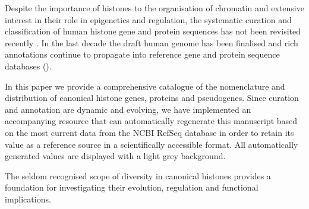   Despite the importance of histones to the organisation of chromatin and extensive interest
  in their role in epigenetics and regulation, the systematic curation and classification of human histone
  gene and protein sequences has not been revisited recently \citep{Marzluff02}.
  In the last decade the draft human genome has been finalised 
  and rich annotations continue to propagate into reference gene and protein sequence databases ().


  In this paper we provide a comprehensive catalogue of the nomenclature and distribution 
  of canonical histone genes, proteins and pseudogenes. 
  Since curation and annotation are dynamic and evolving, we have implemented an accompanying resource 
  that can automatically regenerate this manuscript based on the most current data from the NCBI RefSeq database 
  in order to retain its value as a reference source in a scientifically accessible format.
  All automatically generated values are displayed with a light grey background.
  
  The seldom recognised scope of diversity in canonical histones provides a foundation for investigating 
  their evolution, regulation and functional implications.


